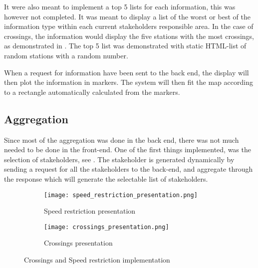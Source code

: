 It were also meant to implement a top 5 lists for each information, this was
however not completed. It was meant to display a list of the worst or best of
the information type within each current stakeholders responsible area. In the
case of crossings, the information would display the five stations with the 
most crossings, as demonstrated in . The top 5 list was 
demonstrated with static HTML-list of random stations with a random number.

When a request for information have been sent to the back end, the display will
then plot the information in markers. The system will then fit the map
according to a rectangle automatically calculated from the markers.

\subsection{Aggregation} %
\label{sub:front_end_aggregation}
Since most of the aggregation was done in the back end, there was not much
needed to be done in the front-end. One of the first things implemented, was 
the selection of stakeholders, see . The
stakeholder is generated dynamically by sending a request for all the 
stakeholders to the back-end, and aggregate through the response which will 
generate the selectable list of stakeholders. 


\begin{figure}[h!tbp]
	\centering
	\begin{subfigure}{0.6\textwidth}
		\texttt{[image: speed\_restriction\_presentation.png]}
		\caption[Speed restriction presentation]{Speed restriction presentation}
		\label{fig:speed_restriction_presentation}
	\end{subfigure}
	\begin{subfigure}{0.25\textwidth}
		\texttt{[image: crossings\_presentation.png]}
		\caption[Crossings presentation]{Crossings presentation}
		\label{fig:crossings_presentation}
	\end{subfigure}
	\caption[Crossings and Speed restriction implementation]{Crossings and Speed restriction
	implementation}
	\label{fig:crossings_and_speed_restriction_implementation}
\end{figure}


